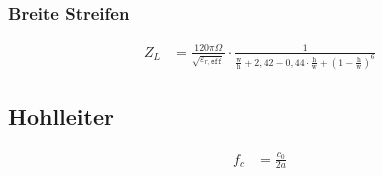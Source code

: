 \subsubsection{Breite Streifen}
\begin{align*}
    Z_L & = \frac{120\pi\Omega}{\sqrt{\varepsilon_{r,\texttt{eff}}}}\cdot\frac{1}{\frac{\text{w}}{\text{h}}+2,42-0,44\cdot\frac{\mathrm{h}}{\mathrm{w}}+\left(1-\frac{\mathrm{h}}{\mathrm{w}}\right)^6}
\end{align*}

\subsection{Hohlleiter}
\begin{align*}
    f_c & = \frac{c_0}{2a}
\end{align*}
